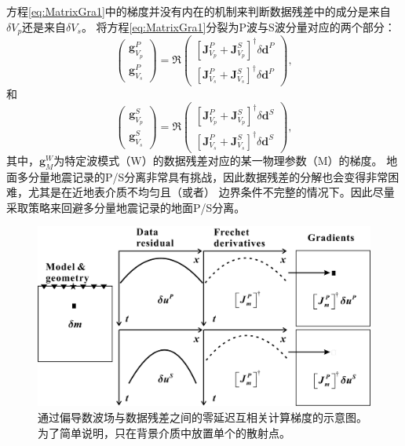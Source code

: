 方程\eqref{eq:MatrixGra1}中的梯度并没有内在的机制来判断数据残差中的成分是来自$\delta V_p$还是来自$\delta V_s$。
将方程\eqref{eq:MatrixGra1}分裂为P波与S波分量对应的两个部分：
\begin{equation}
        \begin{pmatrix}
                \mathbf{g}^P_{V_p}\\
                \mathbf{g}^P_{V_s}
        \end{pmatrix}
        =\mathfrak{R}\begin{pmatrix}
                [\mathbf{J}^P_{V_p}+\mathbf{J}^S_{V_p}]^{\dagger}\delta \mathbf{d}^P\\
                [\mathbf{J}^P_{V_s}+\mathbf{J}^S_{V_s}]^{\dagger}\delta \mathbf{d}^P
        \end{pmatrix},
        \label{eq:DEMatrixGraP}
\end{equation}
和
\begin{equation}
        \begin{pmatrix}
                \mathbf{g}^S_{V_p}\\
                \mathbf{g}^S_{V_s}
        \end{pmatrix}
        =\mathfrak{R}\begin{pmatrix}
                [\mathbf{J}^P_{V_p}+\mathbf{J}^S_{V_p}]^{\dagger}\delta \mathbf{d}^S\\
                [\mathbf{J}^P_{V_s}+\mathbf{J}^S_{V_s}]^{\dagger}\delta \mathbf{d}^S
        \end{pmatrix},
        \label{eq:DEMatrixGraS}
\end{equation}
其中，$\mathbf{g}^W_M$为特定波模式（W）的数据残差对应的某一物理参数（M）的梯度。
地面多分量地震记录的P/S分离非常具有挑战，因此数据残差的分解也会变得非常困难，尤其是在近地表介质不均匀且（或者）
边界条件不完整的情况下。因此尽量采取策略来回避多分量地震记录的地面P/S分离。
\begin{figure}
    \begin{center}
        \includegraphics[width=1.0\textwidth]{Figure/chapter02/finalMarmousiII/Fig/zerolagLAST1.pdf}
        \caption{
			通过偏导数波场与数据残差之间的零延迟互相关计算梯度的示意图。为了简单说明，只在背景介质中放置单个的散射点。
    }
    \label{fig:crossterm}
    \end{center}
\end{figure}

